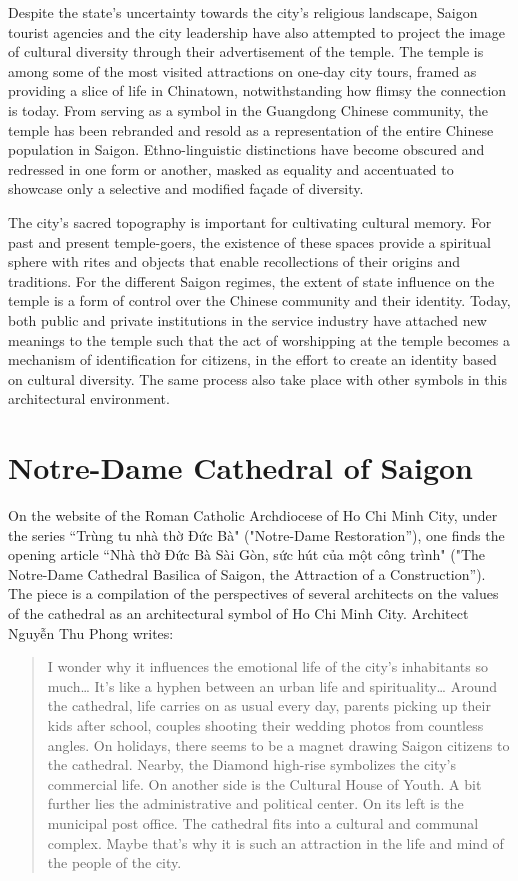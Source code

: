 Despite the state's uncertainty towards the city's religious landscape, Saigon tourist agencies and the city leadership have also attempted to project the image of cultural diversity through their advertisement of the temple. The temple is among some of the most visited attractions on one-day city tours, framed as providing a slice of life in Chinatown, notwithstanding how flimsy the connection is today.  From serving as a symbol in the Guangdong Chinese community, the temple has been rebranded and resold as a representation of the entire Chinese population in Saigon. Ethno-linguistic distinctions have become obscured and redressed in one form or another,  masked as equality and accentuated to showcase only a selective and modified façade of diversity.

The city's sacred topography is important for cultivating cultural memory. For past and present temple-goers, the existence of these spaces provide a spiritual sphere with rites and objects that enable recollections of their origins and traditions. For the different Saigon regimes, the extent of state influence on the temple is a form of control over the Chinese community and their identity. Today, both public and private institutions in the service industry have attached new meanings to the temple such that the act of worshipping at the temple becomes a mechanism of identification for citizens, in the effort to create an identity based on cultural diversity. The same process also take place with other symbols in this architectural environment.

\section{Notre-Dame Cathedral of Saigon}

On the website of the Roman Catholic Archdiocese of Ho Chi Minh City, under the series “Trùng tu nhà thờ Đức Bà" ("Notre-Dame Restoration”), one finds the opening article “Nhà thờ Đức Bà Sài Gòn, sức hút của một công trình" ("The Notre-Dame Cathedral Basilica of Saigon, the Attraction of a Construction”). The piece is a compilation of the perspectives of several architects on the values of the cathedral as an architectural symbol of Ho Chi Minh City. Architect Nguyễn Thu Phong writes:

\begin{quotation}
I wonder why it influences the emotional life of the city’s inhabitants so much… It’s like a hyphen between an urban life and spirituality… Around the cathedral, life carries on as usual every day, parents picking up their kids after school, couples shooting their wedding photos from countless angles. On holidays, there seems to be a magnet drawing Saigon citizens to the cathedral. Nearby, the Diamond high-rise symbolizes the city’s commercial life. On another side is the Cultural House of Youth. A bit further lies the administrative and political center. On its left is the municipal post office. The cathedral fits into a cultural and communal complex. Maybe that’s why it is such an attraction in the life and mind of the people of the city.
\end{quotation}

